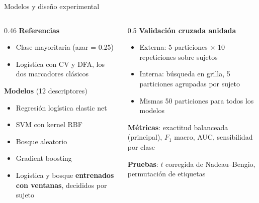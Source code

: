\documentclass[aspectratio=169,10pt]{beamer}
\begin{document}
\begin{frame}{Modelos y diseño experimental}
  \begin{columns}[T]
    \begin{column}{0.46\textwidth}
      \textbf{Referencias}
      \begin{itemize}
        \item Clase mayoritaria (azar = 0.25)
        \item Logística con CV y DFA, los dos marcadores clásicos
      \end{itemize}
      \vspace{0.4em}
      \textbf{Modelos} (12 descriptores)
      \begin{itemize}
        \item Regresión logística elastic net
        \item SVM con kernel RBF
        \item Bosque aleatorio
        \item Gradient boosting
        \item Logística y bosque \textbf{entrenados con ventanas}, decididos por sujeto
      \end{itemize}
    \end{column}
    \begin{column}{0.5\textwidth}
      \textbf{Validación cruzada anidada}
      \begin{itemize}
        \item Externa: 5 particiones $\times$ 10 repeticiones sobre sujetos
        \item Interna: búsqueda en grilla, 5 particiones agrupadas por sujeto
        \item Mismas 50 particiones para todos los modelos
      \end{itemize}
      \vspace{0.4em}
      \textbf{Métricas}: exactitud balanceada (principal), $F_1$ macro, AUC, sensibilidad por clase

      \vspace{0.4em}
      \textbf{Pruebas}: $t$ corregida de Nadeau--Bengio, permutación de etiquetas
    \end{column}
  \end{columns}
\end{frame}
\end{document}
